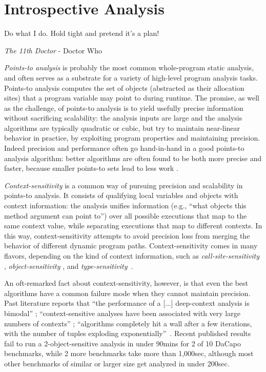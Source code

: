 \chapter{Introspective Analysis} \label{chapter:introspective}

\epigraph{Do what I do. Hold tight and pretend it’s a plan!}{\textit{The 11th Doctor} - Doctor Who}

\emph{Points-to analysis} is probably the most common whole-program
static analysis, and often serves as a substrate for a variety of
high-level program analysis tasks. Points-to analysis computes the set
of objects (abstracted as their allocation sites) that a program
variable may point to during runtime. The promise, as well as the
challenge, of points-to analysis is to yield usefully precise
information without sacrificing scalability: the analysis inputs are
large and the analysis algorithms are typically quadratic or cubic,
but try to maintain near-linear behavior in practice, by exploiting
program properties and maintaining precision. Indeed precision and
performance often go hand-in-hand in a good points-to analysis
algorithm: better algorithms are often found to be both more precise
and faster, because smaller points-to sets lead to less work
\cite{article:2008:tosem:Lhotak}.

\emph{Context-sensitivity} is a common way of pursuing precision and
scalability in points-to analysis. It consists of qualifying local
variables and objects with context information: the analysis unifies
information (e.g., ``what objects this method argument can point to'')
over all possible executions that map to the same context value, while
separating executions that map to different contexts. In this way,
context-sensitivity attempts to avoid precision loss from merging the
behavior of different dynamic program paths. Context-sensitivity comes
in many flavors, depending on the kind of context information, such as
\emph{call-site-sensitivity}
\cite{col:1981:Sharir,thesis:Shivers},
\emph{object-sensitivity}
\cite{issta:2002:Milanova,article:2005:Milanova}, and
\emph{type-sensitivity}~\cite{popl:2011:Smaragdakis}.

An oft-remarked fact about context-sensitivity, however, is that even
the best algorithms have a common failure mode when they cannot
maintain precision. Past literature reports that ``the performance of
a [...]  deep-context analysis is bimodal'' \cite{popl:2011:Smaragdakis};
``context-sensitive analyses have been associated with very large
numbers of contexts'' \cite{cc:2006:Lhotak}; ``algorithms
completely hit a wall after a few iterations, with the number of
tuples exploding
exponentially''~\cite{pldi:2011:Liang}.  Recent
published results~\cite{pldi:2013:Kastrinis} fail to run a
2-object-sensitive analysis in under 90mins for 2 of 10 DaCapo
benchmarks, while 2 more benchmarks take more than 1,000sec, although
most other benchmarks of similar or larger size get analyzed in under
200sec.

